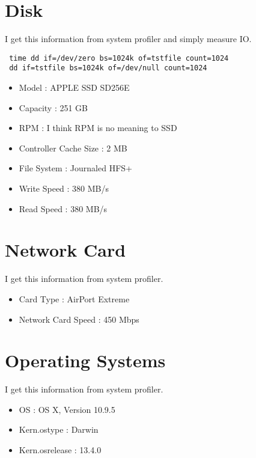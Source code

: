 \section{Disk}
I get this information from system profiler and simply measure IO.

\begin{verbatim}
 time dd if=/dev/zero bs=1024k of=tstfile count=1024
 dd if=tstfile bs=1024k of=/dev/null count=1024
\end{verbatim}

\begin{itemize}
\item Model : APPLE SSD SD256E
\item Capacity : 251 GB
\item RPM : I think RPM is no meaning to SSD
\item Controller Cache Size : 2 MB
\item File System : Journaled HFS+
\item Write Speed : 380 MB/s
\item Read Speed : 380 MB/s
\end{itemize}

\section{Network Card}
I get this information from system profiler.

\begin{itemize}
\item Card Type : AirPort Extreme
\item Network Card Speed : 450 Mbps
\end{itemize}

\section{Operating Systems}
I get this information from system profiler.

\begin{itemize}
\item OS : OS X, Version 10.9.5
\item Kern.ostype : Darwin
\item Kern.osrelease : 13.4.0
\end{itemize}

